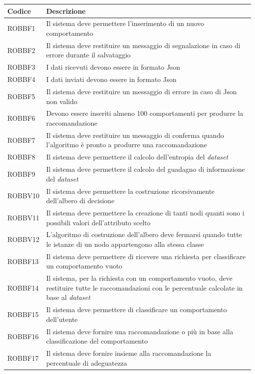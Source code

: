 \begin{longtable}{|l|p{7cm}|}
\hline
\textbf{Codice} &	\textbf{Descrizione}	\\\hline
ROBBF1	&	Il sistema deve permettere l'inserimento di un nuovo comportamento	\\\hline
ROBBF2	&	Il sistema deve restituire un messaggio di segnalazione in caso di errore durante il salvataggio \\\hline
ROBBF3	&	I dati ricevuti devono essere in formato Json \\\hline
ROBBF4	&	I dati inviati devono essere in formato Json \\\hline
ROBBF5	&	Il sistema deve restituire un messaggio di errore in caso di Json non valido \\\hline
ROBBF6	&	Devono essere inseriti almeno 100 comportamenti per produrre la raccomandazione \\\hline
ROBBF7	&	Il sistema deve restituire un messaggio di conferma quando l'algoritmo è pronto a produrre una raccomandazione	\\\hline
ROBBF8	&	Il sistema deve permettere il calcolo dell'entropia del \emph{dataset} \\\hline
ROBBF9	&	Il sistema deve permettere il calcolo del guadagno di informazione del \emph{dataset}	\\\hline
ROBBV10	&	Il sistema deve permettere la costruzione ricorsivamente dell'albero di decisione	\\\hline
ROBBV11	&	Il sistema deve permettere la creazione di tanti nodi quanti sono i possibili valori dell'attributo scelto \\\hline
ROBBV12	&	L'algoritmo di costruzione dell'albero deve fermarsi quando tutte le istanze di un nodo appartengono alla stessa classe \\\hline
ROBBF13	&	Il sistema deve permettere di ricevere una richiesta per classificare un comportamento vuoto \\\hline
ROBBF14	&	Il sistema, per la richiesta con un comportamento vuoto, deve restituire tutte le raccomandazioni con le percentuale calcolate in base al \emph{dataset} \\\hline
ROBBF15	&	Il sistema deve permettere di classificare un comportamento dell'utente \\\hline
ROBBF16	&	Il sistema deve fornire una raccomandazione o più in base alla classificazione del comportamento \\\hline
ROBBF17	&	Il sistema deve fornire insieme alla raccomandazione la percentuale di adeguatezza	\\\hline

\end{longtable}
